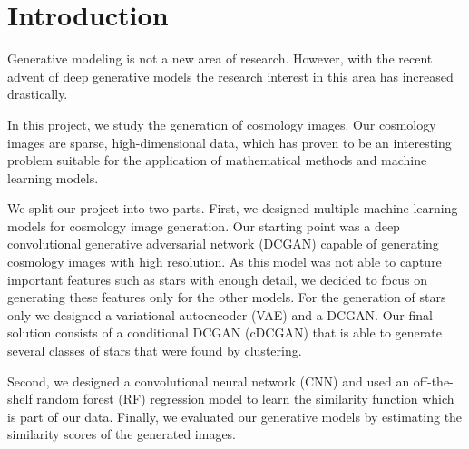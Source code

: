 \documentclass[10pt,conference,compsocconf]{IEEEtran}
\newcommand\TODO[1]{\textcolor{red}{#1}} %
\begin{document}
\section{Introduction}
\label{sec:introduction}
Generative modeling is not a new area of research. However, with the recent advent of deep generative models the research interest in this area has increased drastically. 

In this project, we study the generation of cosmology images. Our cosmology images are sparse, high-dimensional data, which has proven to be an interesting problem suitable for the application of mathematical methods and machine learning models.

We split our project into two parts. First, we designed multiple machine learning models for cosmology image generation. Our starting point was a deep convolutional generative adversarial network (DCGAN) capable of generating cosmology images with high resolution. As this model was not able to capture important features such as stars with enough detail, we decided to focus on generating these features only for the other models. 
For the generation of stars only we designed a variational autoencoder (VAE) and a DCGAN. 
Our final solution consists of a conditional DCGAN (cDCGAN) that is able to generate several classes of stars that were found by clustering.

Second, we designed a convolutional neural network (CNN) and used an off-the-shelf random forest (RF) regression model to learn the similarity function which is part of our data. Finally, we evaluated our generative models by estimating the similarity scores of the generated images. 



\end{document}
